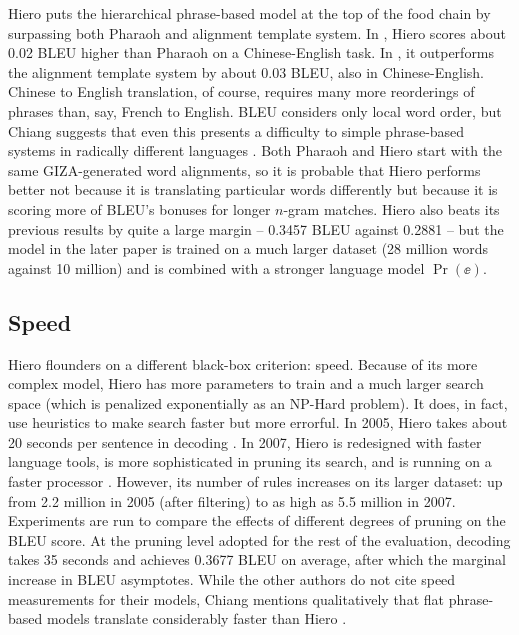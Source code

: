\documentclass[11pt]{article}
\begin{document}
Hiero puts the hierarchical phrase-based model at the top of the food chain by surpassing both Pharaoh
and alignment template system. In \cite{chiang:05}, Hiero scores about 0.02 BLEU higher than Pharaoh on a Chinese-English
task. In \cite{chiang:07}, it outperforms the alignment template system by about 0.03 BLEU, also in Chinese-English. 
Chinese to English translation, of course, requires many more reorderings of phrases than, say, French to English.
BLEU considers only local word order, but Chiang suggests that even this presents a difficulty to simple 
phrase-based systems in radically different languages \cite{chiang:05}.
Both Pharaoh and Hiero start with the same GIZA-generated word alignments,
so it is probable that Hiero performs better not because it is translating particular words differently but because it is scoring
more of BLEU's bonuses for longer $n$-gram matches.
Hiero also beats its previous results by quite a large margin -- 0.3457 BLEU against 0.2881 -- but the model in the later
paper is trained on a much larger dataset (28 million words against 10 million) and is combined with a stronger language model $\Pr(\ee)$.

\subsection{Speed}
Hiero flounders on a different black-box criterion: speed. 
Because of its more complex model, Hiero has more parameters to train and a much larger search space
(which is penalized exponentially as an NP-Hard problem). 
It does, in fact, use heuristics to make search faster but more errorful.
In 2005, Hiero takes about 20 seconds per sentence in decoding \cite{chiang:05}.
In 2007, Hiero is redesigned with faster language tools, is more sophisticated in pruning its search,
and is running on a faster processor \cite{chiang:07}.
However, its number of rules increases on its larger dataset: up from 2.2 million in 2005 (after filtering) to as high
as 5.5 million in 2007. Experiments are run to compare the effects of different degrees of pruning
on the BLEU score. At the pruning level adopted for the rest of the evaluation, decoding takes 35 seconds and achieves
0.3677 BLEU on average, after which the marginal increase in BLEU asymptotes.
While the other authors do not cite speed measurements for their models, Chiang mentions qualitatively that flat phrase-based
models translate considerably faster than Hiero \cite{chiang:07}.
\end{document}
